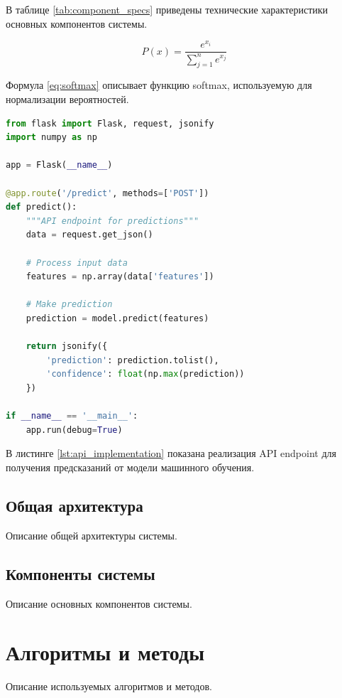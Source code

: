 В таблице \ref{tab:component_specs} приведены технические характеристики основных компонентов системы.

\begin{equation}
P(x) = \frac{e^{x_i}}{\sum_{j=1}^{n} e^{x_j}}
\label{eq:softmax}
\end{equation}

Формула \ref{eq:softmax} описывает функцию softmax, используемую для нормализации вероятностей.

\begin{lstlisting}[style=code, language=Python, caption={Пример реализации API}, label={lst:api_implementation}]
from flask import Flask, request, jsonify
import numpy as np

app = Flask(__name__)

@app.route('/predict', methods=['POST'])
def predict():
    """API endpoint for predictions"""
    data = request.get_json()
    
    # Process input data
    features = np.array(data['features'])
    
    # Make prediction
    prediction = model.predict(features)
    
    return jsonify({
        'prediction': prediction.tolist(),
        'confidence': float(np.max(prediction))
    })

if __name__ == '__main__':
    app.run(debug=True)
\end{lstlisting}

В листинге \ref{lst:api_implementation} показана реализация API endpoint для получения предсказаний от модели машинного обучения.

\subsection{Общая архитектура}

Описание общей архитектуры системы.

\subsection{Компоненты системы}

Описание основных компонентов системы.

\section{Алгоритмы и методы}

Описание используемых алгоритмов и методов.

